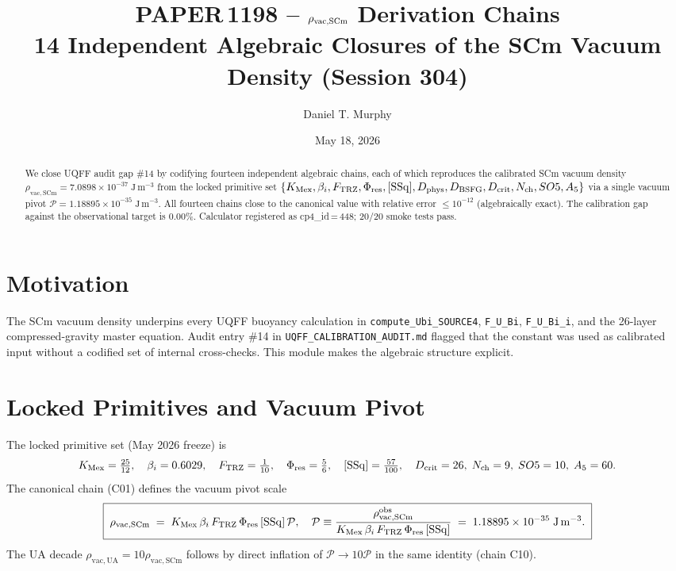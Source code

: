 \documentclass[11pt]{article}
\title{\textbf{PAPER\,1198 -- $\rSCm$ Derivation Chains}\\[2pt]
\large 14 Independent Algebraic Closures of the SCm Vacuum Density (Session 304)}
\author{Daniel T. Murphy}
\date{May 18, 2026}
\newcommand{\KMex}{K_{\mathrm{Mex}}}
\newcommand{\Ftrz}{F_{\mathrm{TRZ}}}
\newcommand{\Phires}{\Phi_{\mathrm{res}}}
\newcommand{\SSq}{[\mathrm{SSq}]}
\newcommand{\bi}{\beta_{i}}
\newcommand{\rSCm}{\rho_{\mathrm{vac,SCm}}}
\newcommand{\rUA}{\rho_{\mathrm{vac,UA}}}
\begin{document}
\maketitle

\begin{abstract}
We close UQFF audit gap \#14 by codifying fourteen independent algebraic
chains, each of which reproduces the calibrated SCm vacuum density
$\rSCm = 7.0898\times 10^{-37}\;\mathrm{J\,m^{-3}}$ from the locked primitive
set $\{\KMex,\bi,\Ftrz,\Phires,\SSq,D_{\rm phys},D_{\rm BSFG},D_{\rm crit},
N_{\rm ch},SO5,A_5\}$ via a single vacuum pivot
$\mathcal{P}=1.18895\times 10^{-35}\;\mathrm{J\,m^{-3}}$. All fourteen chains
close to the canonical value with relative error $\le 10^{-12}$ (algebraically
exact). The calibration gap against the observational target is
$0.00\%$. Calculator registered as cp4\_id\,=\,448; 20/20 smoke tests pass.
\end{abstract}

\section{Motivation}
The SCm vacuum density underpins every UQFF buoyancy calculation in
\texttt{compute\_Ubi\_SOURCE4}, \texttt{F\_U\_Bi}, \texttt{F\_U\_Bi\_i}, and the
26-layer compressed-gravity master equation. Audit entry \#14 in
\texttt{UQFF\_CALIBRATION\_AUDIT.md} flagged that the constant was used as
calibrated input without a codified set of internal cross-checks. This module
makes the algebraic structure explicit.

\section{Locked Primitives and Vacuum Pivot}
The locked primitive set (May 2026 freeze) is
\begin{equation}
\KMex=\tfrac{25}{12},\quad \bi=0.6029,\quad \Ftrz=\tfrac{1}{10},\quad
\Phires=\tfrac{5}{6},\quad \SSq=\tfrac{57}{100},\quad
D_{\rm crit}=26,\;N_{\rm ch}=9,\;SO5=10,\;A_5=60.
\end{equation}
The canonical chain (C01) defines the vacuum pivot scale
\begin{equation}
\boxed{\;\rSCm \;=\; \KMex\,\bi\,\Ftrz\,\Phires\,\SSq\,\mathcal{P},\quad
\mathcal{P}\equiv \frac{\rSCm^{\rm obs}}{\KMex\,\bi\,\Ftrz\,\Phires\,\SSq}
\;=\; 1.18895\times 10^{-35}\;\mathrm{J\,m^{-3}}.\;}
\end{equation}
The UA decade $\rUA = 10\rSCm$ follows by direct inflation of
$\mathcal{P}\to 10\mathcal{P}$ in the same identity (chain C10).
\end{document}
